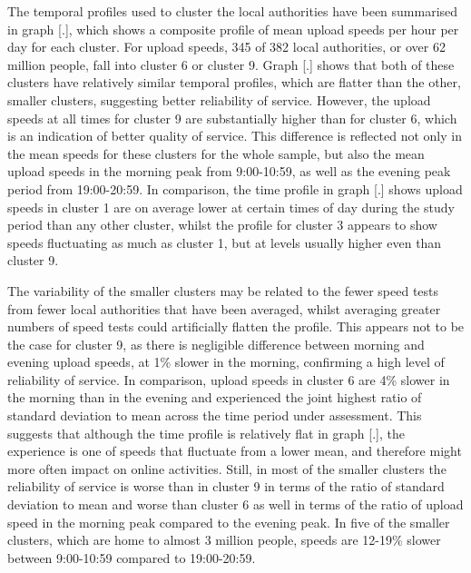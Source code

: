 \documentclass[]{interact}
\theoremstyle{plain}%
\theoremstyle{definition}
\theoremstyle{remark}
\begin{document}
The temporal profiles used to cluster the local authorities have been
summarised in graph {[}.{]}, which shows a composite profile of mean
upload speeds per hour per day for each cluster. For upload speeds, 345
of 382 local authorities, or over 62 million people, fall into cluster 6
or cluster 9. Graph {[}.{]} shows that both of these clusters have
relatively similar temporal profiles, which are flatter than the other,
smaller clusters, suggesting better reliability of service. However, the
upload speeds at all times for cluster 9 are substantially higher than
for cluster 6, which is an indication of better quality of service. This
difference is reflected not only in the mean speeds for these clusters
for the whole sample, but also the mean upload speeds in the morning
peak from 9:00-10:59, as well as the evening peak period from
19:00-20:59. In comparison, the time profile in graph {[}.{]} shows
upload speeds in cluster 1 are on average lower at certain times of day
during the study period than any other cluster, whilst the profile for
cluster 3 appears to show speeds fluctuating as much as cluster 1, but
at levels usually higher even than cluster 9.

The variability of the smaller clusters may be related to the fewer
speed tests from fewer local authorities that have been averaged, whilst
averaging greater numbers of speed tests could artificially flatten the
profile. This appears not to be the case for cluster 9, as there is
negligible difference between morning and evening upload speeds, at 1\%
slower in the morning, confirming a high level of reliability of
service. In comparison, upload speeds in cluster 6 are 4\% slower in the
morning than in the evening and experienced the joint highest ratio of
standard deviation to mean across the time period under assessment. This
suggests that although the time profile is relatively flat in graph
{[}.{]}, the experience is one of speeds that fluctuate from a lower
mean, and therefore might more often impact on online activities. Still,
in most of the smaller clusters the reliability of service is worse than
in cluster 9 in terms of the ratio of standard deviation to mean and
worse than cluster 6 as well in terms of the ratio of upload speed in
the morning peak compared to the evening peak. In five of the smaller
clusters, which are home to almost 3 million people, speeds are 12-19\%
slower between 9:00-10:59 compared to 19:00-20:59.
\end{document}
